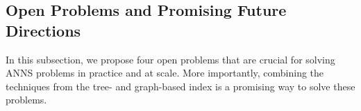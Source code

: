 \documentclass[11pt]{article}
\begin{document}




\subsection{Open Problems and Promising Future Directions}
In this subsection, we propose four open problems that are crucial for solving ANNS problems in practice and at scale. 
More importantly, combining the techniques from the tree- and graph-based index is a promising way to solve these problems. 
\end{document}
